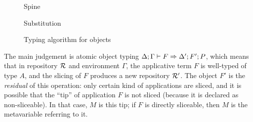 \documentclass{llncs}
\begin{document}
\begin{figure*}
  \begin{mathpar}

  \end{mathpar}

  \qquad
  {Spine}

  \begin{mathpar}

  \end{mathpar}

  \qquad
  {Substitution}

  \begin{mathpar}



  \end{mathpar}

  \caption{Typing algorithm for objects}
  \label{fig:obj-typing}
\end{figure*}

The main judgement is atomic object typing $\jf\Delta\Gamma F
{\Delta'} {F'} P$, which means that in repository $\mr$ and environment $\Gamma$, the
applicative term $F$ is well-typed of type $A$, and the slicing of $F$
produces a new repository $\mmr$. The object $F'$ is the
\emph{residual} of this operation: only certain kind of applications
are sliced, and it is possible that the ``tip'' of application $F$ is
not sliced (because it is declared as non-sliceable). In that case,
$M$ is this tip; if $F$ is directly sliceable, then $M$ is the
metavariable referring to it.
\end{document}
